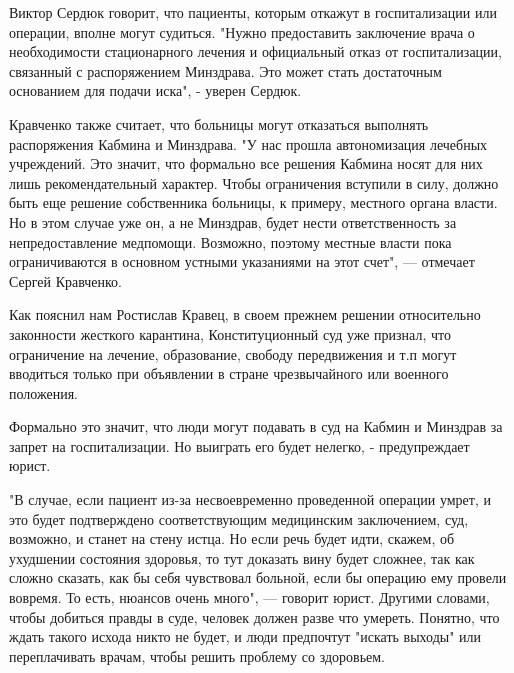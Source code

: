 Виктор Сердюк говорит, что пациенты, которым откажут в госпитализации или
операции, вполне могут судиться. "Нужно предоставить заключение врача о
необходимости стационарного лечения и официальный отказ от госпитализации,
связанный с распоряжением Минздрава. Это может стать достаточным основанием для
подачи иска", - уверен Сердюк.

Кравченко также считает, что больницы могут отказаться выполнять распоряжения
Кабмина и Минздрава. "У нас прошла автономизация лечебных учреждений. Это
значит, что формально все решения Кабмина носят для них лишь рекомендательный
характер. Чтобы ограничения вступили в силу, должно быть еще решение
собственника больницы, к примеру, местного органа власти. Но в этом случае уже
он, а не Минздрав, будет нести ответственность за непредоставление медпомощи.
Возможно, поэтому местные власти пока ограничиваются в основном устными
указаниями на этот счет", --- отмечает Сергей Кравченко.

Как пояснил нам Ростислав Кравец, в своем прежнем решении относительно
законности жесткого карантина, Конституционный суд уже признал, что ограничение
на лечение, образование, свободу передвижения и т.п могут вводиться только при
объявлении в стране чрезвычайного или военного положения.

Формально это значит, что люди могут подавать в суд на Кабмин и Минздрав за
запрет на госпитализации. Но выиграть его будет нелегко, - предупреждает юрист.

"В случае, если пациент из-за несвоевременно проведенной операции умрет, и это
будет подтверждено соответствующим медицинским заключением, суд, возможно, и
станет на стену истца. Но если речь будет идти, скажем, об ухудшении состояния
здоровья, то тут доказать вину будет сложнее, так как сложно сказать, как бы
себя чувствовал больной, если бы операцию ему провели вовремя. То есть, нюансов
очень много", --- говорит юрист. Другими словами, чтобы добиться правды в суде,
человек должен разве что умереть. Понятно, что ждать такого исхода никто не
будет, и люди предпочтут "искать выходы" или переплачивать врачам, чтобы решить
проблему со здоровьем.
